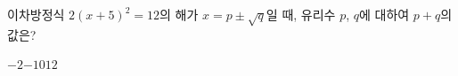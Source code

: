 이차방정식 $2(x+5)^2=12$의 해가 $x=p\pm\sqrt{q}$일 때, 유리수 $p$, $q$에 대하여 $p+q$의 값은?
\begin{choices32}{$-2$}{$-1$}{$0$}{$1$}{$2$}\end{choices32}

